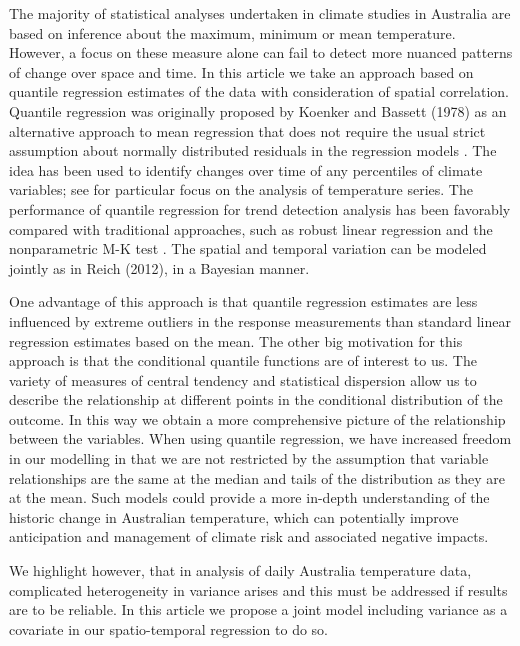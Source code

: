 \documentclass[fleqn,10pt]{wlscirep}
\begin{document}
The majority of statistical analyses undertaken in climate studies in Australia are based on inference about the maximum, minimum or mean temperature. However, a focus on these measure alone can fail to detect more nuanced patterns of change over space and time.
In this article we take an approach based on quantile regression estimates of the data with consideration of spatial correlation. Quantile regression was originally proposed by Koenker and Bassett
(1978)  as an alternative approach to mean regression that does not require the usual strict assumption about normally distributed residuals in the regression models \cite{Koenker1978}. The idea has been used to identify changes over time of any percentiles of climate variables;  see \cite{koenker1994quantile,Barbosa2011,gao2017quantile,Franzke2013} for particular focus on the analysis of temperature series.
The performance of quantile regression for trend detection analysis has been favorably compared with traditional approaches, such as robust linear regression and the nonparametric M-K test \cite{gao2017quantile}. The spatial and temporal variation can be modeled jointly as  in Reich (2012), in a Bayesian manner\cite{Brian2013}.

One advantage of this approach is that quantile regression estimates are less influenced by extreme outliers in the response measurements than standard linear regression estimates based on the mean. The other big motivation for this approach is that the conditional quantile functions are of interest to us. {The variety of measures} of central tendency and statistical dispersion allow us to describe the relationship at different points in the conditional distribution of the outcome. In this way we obtain a more comprehensive picture of the relationship between the variables. When using quantile regression, we have increased freedom in our modelling in that we are not restricted by the assumption that variable relationships are the same at the median and tails of the distribution as they are at the mean. {Such models could provide a more} in-depth understanding of the historic change in Australian temperature, which can potentially improve anticipation and management of climate risk and associated negative impacts.

We highlight however,  that in analysis of daily Australia temperature data, complicated heterogeneity in variance arises and this must be addressed if results are to be reliable.
	In this article we propose a joint model including variance as a covariate in our spatio-temporal regression to do so. %
\end{document}
